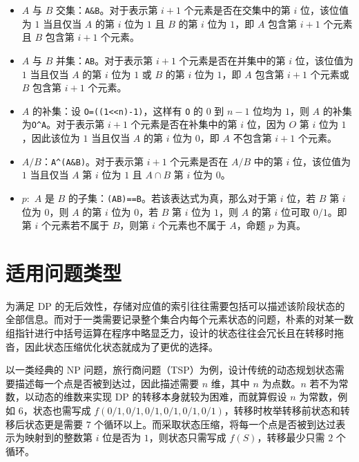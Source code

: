 \begin{itemize}

\item
  \(A\) 与 \(B\) 交集：\texttt{A\&B}。对于表示第 \(i+1\)
  个元素是否在交集中的第 \(i\) 位，该位值为 \(1\) 当且仅当 \(A\) 的第
  \(i\) 位为 \(1\) 且 \(B\) 的第 \(i\) 位为 \(1\)，即 \(A\) 包含第
  \(i+1\) 个元素且 \(B\) 包含第 \(i+1\) 个元素。
\item
  \(A\) 与 \(B\) 并集：\texttt{A\textbar{}B}。对于表示第 \(i+1\)
  个元素是否在并集中的第 \(i\) 位，该位值为 \(1\) 当且仅当 \(A\) 的第
  \(i\) 位为 \(1\) 或 \(B\) 的第 \(i\) 位为 \(1\)，即 \(A\) 包含第
  \(i+1\) 个元素或 \(B\) 包含第 \(i+1\) 个元素。
\item
  \(A\) 的补集：设 \texttt{O=((1\textless{}\textless{}n)-1)}，这样有
  \texttt{O} 的 \(0\) 到 \(n-1\) 位均为 \(1\)，则 \(A\)
  的补集为\texttt{O\^{}A}。对于表示第 \(i+1\) 个元素是否在补集中的第
  \(i\) 位，因为 \(O\) 第 \(i\) 位为 \(1\)，因此该位为 \(1\) 当且仅当
  \(A\) 的第 \(i\) 位为 \(0\)，即 \(A\) 不包含第 \(i+1\) 个元素。
\item
  \(A/B\)：\texttt{A\^{}(A\&B)}。对于表示第 \(i+1\) 个元素是否在 \(A/B\)
  中的第 \(i\) 位，该位值为 \(1\) 当且仅当 \(A\) 第 \(i\) 位为 \(1\) 且
  \(A\cap B\) 第 \(i\) 位为 \(0\)。
\item
  \(p:\) \(A\) 是 \(B\)
  的子集：\texttt{(A\textbar{}B)==B}。若该表达式为真，那么对于第 \(i\)
  位，若 \(B\) 第 \(i\) 位为 \(0\)，则 \(A\) 的第 \(i\) 位为 \(0\)，若
  \(B\) 第 \(i\) 位为 \(1\)，则 \(A\) 的第 \(i\) 位可取 \(0/1\)。即第
  \(i\) 个元素若不属于 \(B\)，则第 \(i\) 个元素也不属于 \(A\)，命题
  \(p\) 为真。
\end{itemize}

\section{适用问题类型}

为满足 DP
的无后效性，存储对应值的索引往往需要包括可以描述该阶段状态的全部信息。而对于一类需要记录整个集合内每个元素状态的问题，朴素的对某一数组指针进行中括号运算在程序中略显乏力，设计的状态往往会冗长且在转移时拖沓，因此状态压缩优化状态就成为了更优的选择。

以一类经典的 NP
问题，旅行商问题（TSP）为例，设计传统的动态规划状态需要描述每一个点是否被到达过，因此描述需要
\(n\) 维，其中 \(n\) 为点数。\(n\) 若不为常数，以动态的维数来实现 DP
的转移本身就较为困难，而就算假设 \(n\) 为常数，例如 \(6\)，状态也需写成
\(f(0/1,0/1,0/1,0/1,0/1,0/1)\)，转移时枚举转移前状态和转移后状态更是需要
\(7\)
个循环以上。而采取状态压缩，将每一个点是否被到达过表示为映射到的整数第
\(i\) 位是否为 \(1\)，则状态只需写成 \(f(S)\)，转移最少只需 \(2\)
个循环。


